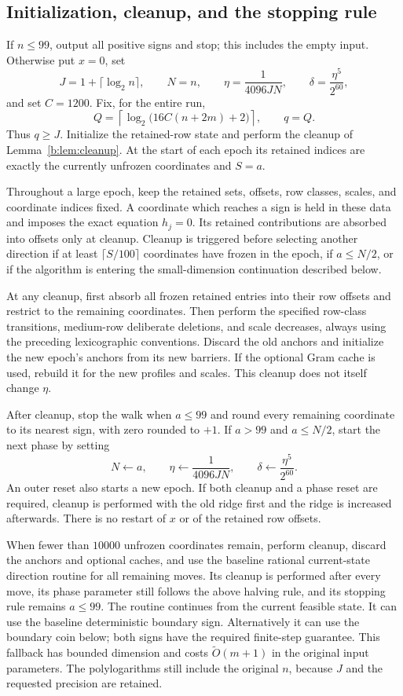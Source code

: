 \documentclass[11pt]{amsart}
\theoremstyle{definition}\newtheorem{definition}[theorem]{Definition}
\theoremstyle{remark}\newtheorem{remark}[theorem]{Remark}
\numberwithin{equation}{section}
\begin{document}
\subsection{Initialization, cleanup, and the stopping rule}\label{a:state}
If $n\le99$, output all positive signs and stop; this includes the empty
input. Otherwise put $x=0$, set
\[
 J=1+\lceil\log_2 n\rceil,\qquad N=n,\qquad
 \eta=\frac1{4096JN},\qquad\delta=\frac{\eta^5}{2^{60}},
\]
and set $C=1200$. Fix, for the entire run,
\[
 Q=\left\lceil\log_2\bigl(16C(n+2m)+2\bigr)\right\rceil,\qquad q=Q.
\]
Thus $q\ge J$. Initialize the retained-row state and perform the cleanup of
Lemma~\ref{b:lem:cleanup}. At the start of each epoch its retained indices
are exactly the currently unfrozen coordinates and $S=a$.

Throughout a large epoch, keep the retained sets, offsets, row classes,
scales, and coordinate indices fixed. A coordinate which reaches a sign
is held in these data and imposes the exact equation $h_j=0$. Its retained
contributions are absorbed into offsets only at cleanup. Cleanup is
triggered before selecting another direction if at least $\lceil S/100\rceil$
coordinates have frozen in the epoch, if $a\le N/2$, or if the algorithm is
entering the small-dimension continuation described below.

At any cleanup, first absorb all frozen retained entries into their row
offsets and restrict to the remaining coordinates. Then perform the
specified row-class transitions, medium-row deliberate deletions, and
scale decreases, always using the preceding lexicographic conventions.
Discard the old anchors and initialize the new epoch's anchors from its
new barriers. If the optional Gram cache is used, rebuild it for the new
profiles and scales. This cleanup does not itself change $\eta$.

After cleanup, stop the walk when $a\le99$ and round every remaining
coordinate to its nearest sign, with zero rounded to $+1$. If $a>99$ and
$a\le N/2$, start the next phase by setting
\[
 N\leftarrow a,\qquad\eta\leftarrow\frac1{4096JN},\qquad
 \delta\leftarrow\frac{\eta^5}{2^{60}}.
\]
An outer reset also starts a new epoch. If both cleanup and a phase reset
are required, cleanup is performed with the old ridge first and the ridge
is increased afterwards. There is no restart of $x$ or of the retained
row offsets.

When fewer than $10000$ unfrozen coordinates remain, perform cleanup,
discard the anchors and optional caches, and use the baseline rational
current-state direction routine for all remaining moves. Its cleanup is
performed after every move, its phase parameter still follows the above
halving rule, and its stopping rule remains $a\le99$. The routine continues from the current feasible state. It can use
the baseline deterministic boundary sign. Alternatively it can use the
boundary coin below; both signs have the required finite-step guarantee.
This fallback has bounded dimension and costs
$\widetilde O(m+1)$ in the original input parameters. The polylogarithms
still include the original $n$, because $J$ and the requested precision
are retained.
\end{document}
